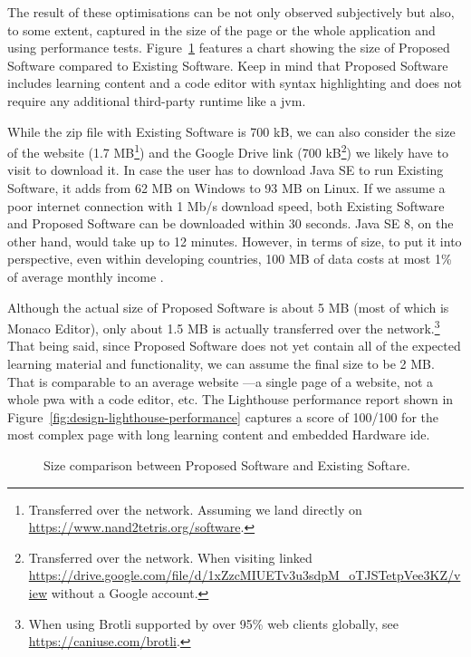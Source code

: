 The result of these optimisations can be not only observed subjectively but also, to some extent, captured in the size of the page or the whole application and using performance tests.
Figure~\ref{fig:design-size-comparison} features a chart showing the size of Proposed Software compared to Existing Software.
Keep in mind that Proposed Software includes learning content and a code editor with syntax highlighting and does not require any additional third-party runtime like a \gls{jvm}.

While the zip file with Existing Software is 700 kB, we can also consider the size of the website (1.7 MB\footnote{Transferred over the network. Assuming we land directly on \url{https://www.nand2tetris.org/software}.}) and the Google Drive link (700 kB\footnote{Transferred over the network. When visiting linked \url{https://drive.google.com/file/d/1xZzcMIUETv3u3sdpM_oTJSTetpVee3KZ/view} without a Google account.}) we likely have to visit to download it.
In case the user has to download Java SE to run Existing Software, it adds from 62 MB on Windows to 93 MB on Linux.
If we assume a poor internet connection with 1 Mb/s download speed, both Existing Software and Proposed Software can be downloaded within 30 seconds.
Java SE 8, on the other hand, would take up to 12 minutes.
However, in terms of size, to put it into perspective, even within developing countries, 100 MB of data costs at most 1\% of average monthly income \parencite{Rodriguez_2022}.

Although the actual size of Proposed Software is about 5 MB (most of which is Monaco Editor), only about 1.5 MB is actually transferred over the network.\footnote{When using Brotli supported by over 95\% web clients globally, see \url{https://caniuse.com/brotli}.}
That being said, since Proposed Software does not yet contain all of the expected learning material and functionality, we can assume the final size to be 2 MB.
That is comparable to an average website \parencite{Indigo_2022}---a single page of a website, not a whole \gls{pwa} with a code editor, etc.
The Lighthouse performance report shown in Figure~\ref{fig:design-lighthouse-performance} captures a score of 100/100 for the most complex page with long learning content and embedded Hardware \gls{ide}.

\begin{figure}[H]
    \centering
    
    \caption{Size comparison between Proposed Software and Existing Softare.}
    \label{fig:design-size-comparison}
\end{figure}

